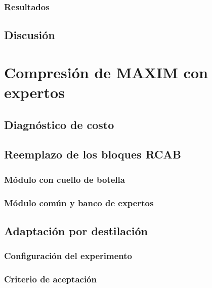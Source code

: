 \documentclass[
  11pt,
  oneside,
  english,
  spanish,
  singlespacing,
  headsepline
]{MastersDoctoralThesis}
\begin{document}
\subsection{Resultados}
\label{sec:shared-resultados}

\section{Discusión}
\label{sec:expertos-discusion}

\chapter{Compresión de MAXIM con expertos}
\label{chap:compresion}

\section{Diagnóstico de costo}
\label{sec:diagnostico}

\section{Reemplazo de los bloques RCAB}
\label{sec:reemplazo}

\subsection{Módulo con cuello de botella}
\label{sec:modulo}

\subsection{Módulo común y banco de expertos}
\label{sec:s1-s2}

\section{Adaptación por destilación}
\label{sec:adaptacion}

\subsection{Configuración del experimento}
\label{sec:adaptacion-config}

\subsection{Criterio de aceptación}
\label{sec:criterio}
\end{document}
